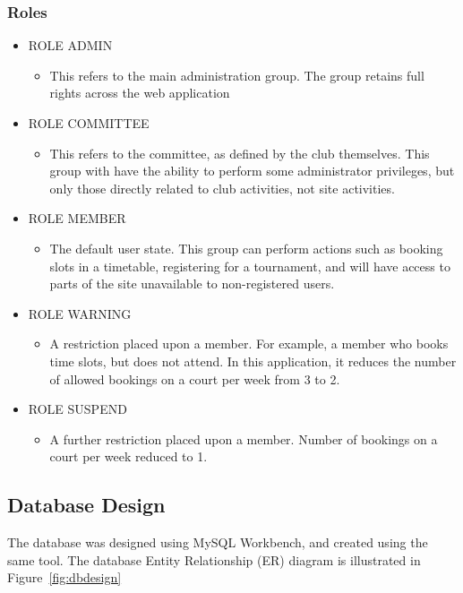 \subsubsection{Roles}
\begin{itemize}
\item ROLE ADMIN
\begin{itemize}
\item This refers to the main administration group. The group retains full rights across the web application
\end{itemize}
\item ROLE COMMITTEE
\begin{itemize}
\item This refers to the committee, as defined by the club themselves. This group with have the ability to perform some administrator privileges, but only those directly related to club activities, not site activities.
\end{itemize}
\item ROLE MEMBER
\begin{itemize}
\item The default user state. This group can perform actions such as booking slots in a timetable, registering for a tournament, and will have access to parts of the site unavailable to non-registered users.
\end{itemize}
\item ROLE WARNING 
\begin{itemize}
\item A restriction placed upon a member. For example, a member who books time slots, but does not attend. In this application, it reduces the number of allowed bookings on a court per week from 3 to 2.
\end{itemize}
\item ROLE SUSPEND
\begin{itemize}
\item A further restriction placed upon a member. Number of bookings on a court per week reduced to 1.
\end{itemize}
\end{itemize}
\label{fig:secRoles}


\subsection{Database Design}

The database was designed using MySQL Workbench, and created using the same tool. The database Entity Relationship (ER) diagram is illustrated in Figure~\ref{fig:dbdesign}

